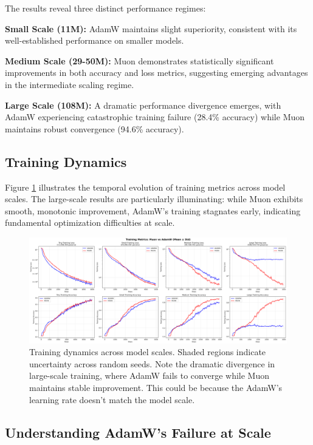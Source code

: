 \documentclass[11pt,a4paper]{article}
\begin{document}
The results reveal three distinct performance regimes:

\textbf{Small Scale (11M):} AdamW maintains slight superiority, consistent with its well-established performance on smaller models.

\textbf{Medium Scale (29-50M):} Muon demonstrates statistically significant improvements in both accuracy and loss metrics, suggesting emerging advantages in the intermediate scaling regime.

\textbf{Large Scale (108M):} A dramatic performance divergence emerges, with AdamW experiencing catastrophic training failure (28.4\% accuracy) while Muon maintains robust convergence (94.6\% accuracy).

\subsection{Training Dynamics}

Figure \ref{fig:training_curves} illustrates the temporal evolution of training metrics across model scales. The large-scale results are particularly illuminating: while Muon exhibits smooth, monotonic improvement, AdamW's training stagnates early, indicating fundamental optimization difficulties at scale.

\begin{figure}[H]
    \centering
    \includegraphics[width=\textwidth]{results/experiment_2_model_size/training_curves_with_uncertainty.png}
    \caption{Training dynamics across model scales. Shaded regions indicate uncertainty across random seeds. Note the dramatic divergence in large-scale training, where AdamW fails to converge while Muon maintains stable improvement. This could be because the AdamW's learning rate doesn't match the model scale.}
    \label{fig:training_curves}
\end{figure}

\subsection{Understanding AdamW's Failure at Scale}
\end{document}
